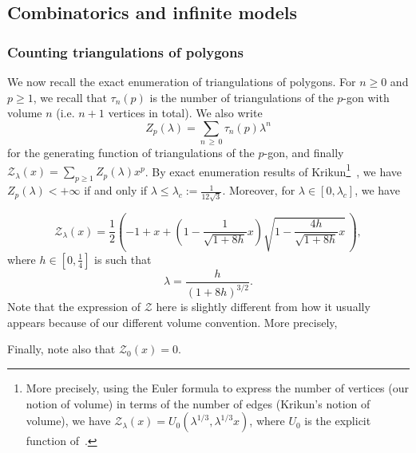 \documentclass[10pt]{amsart}
\theoremstyle{definition}\newtheorem{defi}[theo]{Definition}\newtheorem{rema}[theo]{Remark}\newtheorem{exam}[theo]{Example}\newtheorem{exem}[theo]{Example}\newtheorem{nota}[theo]{Notation}
\newcommand{\clZ}{\mathcal{Z}}
\begin{document}
\subsection{Combinatorics and infinite models}\label{subsec_combinatorics}

\subsubsection*{Counting triangulations of polygons}
We now recall the exact enumeration of triangulations of polygons. For $n \geq 0$ and $p \geq 1$, we recall that $\tau_n(p)$ is the number of triangulations of the $p$-gon with volume $n$ (i.e. $n+1$ vertices in total). We also write
\[
Z_p(\lambda)= \sum_{n\,\geq\,0} \tau_n(p) \lambda^n
\]
for the generating function of triangulations of the $p$-gon, and finally $\clZ_{\lambda}(x) = \sum_{p \geq 1} Z_p(\lambda) x^p$. By exact enumeration results of Krikun\footnote{More precisely, using the Euler formula to express the number of vertices (our notion of volume) in terms of the number of edges (Krikun's notion of volume), we have $\clZ_{\lambda}(x)=U_0(\lambda^{1/3}, \lambda^{1/3}x)$, where $U_0$ is the explicit function of~\cite[Section~2.2]{Kri07}.}~\cite{Kri07}, we have $Z_p(\lambda)<+\infty$ if and only if $\lambda \leq \lambda_c := \frac{1}{12\sqrt{3}}$. Moreover, for $\lambda \in [0,\lambda_c]$, we have

\begin{equation}\label{eqn_computation_Z}
\clZ_{\lambda}(x) = \frac{1}{2} \left(-1+x+\left(1-\frac{1}{\sqrt{1+8h}}x \right) \sqrt{1-\frac{4h}{\sqrt{1+8h}}x} \, \right),
\end{equation}
where $h \in [0,\tfrac{1}{4}]$ is such that
\begin{equation}\label{eqn_defn_h}
\lambda=\frac{h}{(1+8h)^{3/2}}.
\end{equation}
Note that the expression of $\clZ$ here is slightly different from how it usually appears because of our different volume convention. More precisely,



Finally, note also that $\clZ_0(x)=0$.
\end{document}
